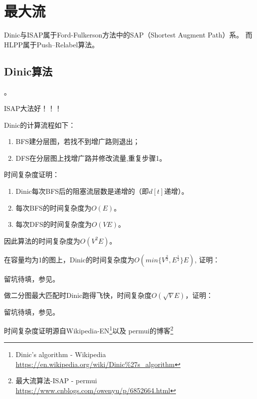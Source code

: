 \section{最大流}
Dinic与ISAP属于Ford-Fulkerson方法中的SAP（Shortest Augment Path）系。
而HLPP属于Push–Relabel算法。
\subsection{Dinic算法}
。

ISAP大法好！！！

Dinic的计算流程如下：
\begin{enumerate}
	\item BFS建分层图，若找不到增广路则退出；
	\item DFS在分层图上找增广路并修改流量,重复步骤1。
\end{enumerate}

时间复杂度证明：

\begin{enumerate}
	\item \begin{lemma}
		Dinic每次BFS后的阻塞流层数是递增的（即$d[t]$递增）。
	\end{lemma}
	\item 每次BFS的时间复杂度为$O(E)$。
	\item 每次DFS的时间复杂度为$O(VE)$。
\end{enumerate}

因此算法的时间复杂度为$O(V^2E)$。

在容量均为1的图上，Dinic的时间复杂度为$O(min \{ V^\frac{2}{3},E^\frac{1}{2} \} E)$,
证明：

留坑待填，参见\cite{NFTGC}。

做二分图最大匹配时Dinic跑得飞快，时间复杂度$O(\sqrt V E)$，证明：

留坑待填，参见\cite{DSNA}。


时间复杂度证明源自Wikipedia-EN\footnote{
	Dinic's algorithm - Wikipedia
	\url{https://en.wikipedia.org/wiki/Dinic\%27s\_algorithm}}以及
	permui的博客\footnote{ 最大流算法-ISAP - permui
		\url{https://www.cnblogs.com/owenyu/p/6852664.html}}
